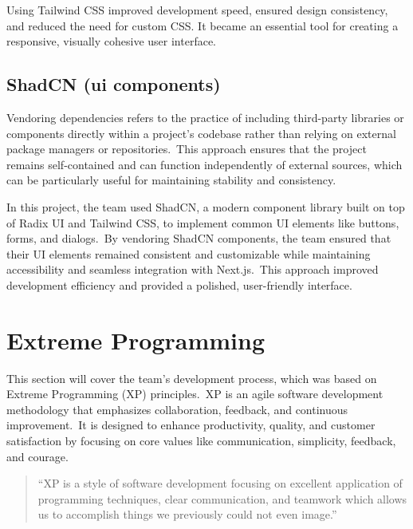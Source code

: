 Using Tailwind CSS improved development speed, ensured design consistency, and reduced the need for custom CSS. It became an essential tool for creating a responsive, visually cohesive user interface.



\subsection{ShadCN (ui components)}\label{subsec:shadcn-(ui-components)}

Vendoring dependencies refers to the practice of including third-party libraries or components directly within a project's codebase rather than relying on external package managers or repositories.\ This approach ensures that the project remains self-contained and can function independently of external sources, which can be particularly useful for maintaining stability and consistency.\cite[ShadCN]{shadcn}

In this project, the team used ShadCN, a modern component library built on top of Radix UI and Tailwind CSS, to implement common UI elements like buttons, forms, and dialogs.\ By vendoring ShadCN components, the team ensured that their UI elements remained consistent and customizable while maintaining accessibility and seamless integration with Next.js.\ This approach improved development efficiency and provided a polished, user-friendly interface.



\section[Extreme Programming]{Extreme Programming}\label{sec:extreme-programming}

This section will cover the team's development process, which was based on Extreme Programming (XP) principles.\ XP is an agile software development methodology that emphasizes collaboration, feedback, and continuous improvement.\ It is designed to enhance productivity, quality, and customer satisfaction by focusing on core values like communication, simplicity, feedback, and courage.

\begin{quote}
    ``XP is a style of software development focusing on excellent application of programming techniques, clear communication, and teamwork which allows us to accomplish things we previously could not even image.''\cite[Extreme Programming]{xp}
\end{quote}

